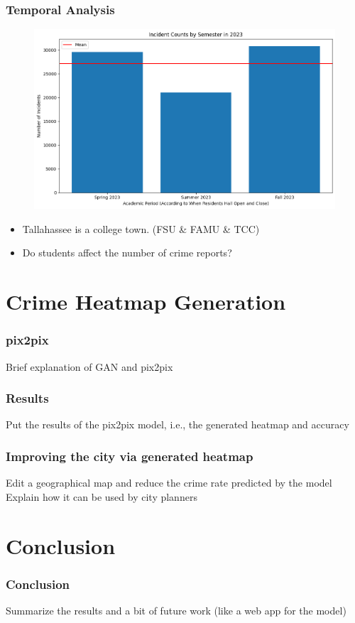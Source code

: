 \documentclass{beamer}
\begin{document}
\begin{frame}
    \frametitle{Temporal Analysis}
    \begin{figure}
        \flushleft
        \includegraphics[width=1\linewidth]{Figures/Incident Counts by Semester in 2023.png}
    \end{figure}
    {\scriptsize %
    \begin{itemize}
        \item Tallahassee is a college town. (FSU \& FAMU \& TCC)
        \item Do students affect the number of crime reports?
    \end{itemize}
    }
\end{frame}





\section{Crime Heatmap Generation}

\begin{frame}
    \frametitle{pix2pix}
    Brief explanation of GAN and pix2pix
\end{frame}

\begin{frame}
    \frametitle{Results}
    Put the results of the pix2pix model, i.e., the generated heatmap and accuracy
\end{frame}

\begin{frame}
    \frametitle{Improving the city via generated heatmap}
    Edit a geographical map and reduce the crime rate predicted by the model
    Explain how it can be used by city planners
\end{frame}

\section{Conclusion}
\begin{frame}
    \frametitle{Conclusion}
    Summarize the results and a bit of future work (like a web app for the model)
\end{frame}
\end{document}
